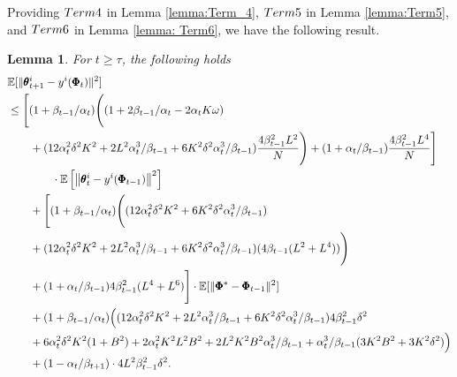 \documentclass{article} %
\theoremstyle{plain}
\newtheorem{lemma}[theorem]{Lemma}
\theoremstyle{definition}
\theoremstyle{remark}
\begin{document}
{{Providing $\textnormal{Term 4}$ in Lemma \ref{lemma:Term_4}, $\textnormal{Term 5}$ in Lemma \ref{lemma:Term5}, and $\textnormal{Term 6}$ in Lemma \ref{lemma: Term6}, we have the following result.}



\begin{lemma}
For $t\geq \tau$, the following holds
\begin{align}
  &\mathbb{E}[\|\pmb{\theta}^{i}_{t+1}-y^i(\pmb{\Phi}_t)\|^2]\nonumber\\
    &\leq\Bigg[(1+\beta_{t-1}/\alpha_t)\Bigg((1+2\beta_{t-1}/\alpha_t-2\alpha_tK\omega)\nonumber\allowdisplaybreaks\\
    &\qquad+(12\alpha_t^2\delta^2K^2+2L^2\alpha_t^3/\beta_{t-1}+6K^2\delta^2\alpha_t^3/\beta_{t-1})\frac{4\beta_{t-1}^2L^2}{N}\Bigg)+(1+\alpha_t/\beta_{t-1})\frac{4\beta_{t-1}^2L^4}{N}\Bigg]\nonumber\allowdisplaybreaks\\
    &\qquad\qquad\cdot\mathbb{E}\left[\left\|\pmb{\theta}_{t}^i-y^i(\pmb{\Phi}_{t-1})\right\|^2 \right]\nonumber\allowdisplaybreaks\\
    &\qquad+\Bigg[(1+\beta_{t-1}/\alpha_t)\Bigg((12\alpha_t^2\delta^2K^2+6K^2\delta^2\alpha_t^3/\beta_{t-1})\nonumber\allowdisplaybreaks\\
    &\qquad +(12\alpha_t^2\delta^2K^2+2L^2\alpha_t^3/\beta_{t-1}+6K^2\delta^2\alpha_t^3/\beta_{t-1})(4\beta_{t-1}(L^2+L^4))\Bigg)\nonumber\allowdisplaybreaks\\
   &\qquad+(1+\alpha_t/\beta_{t-1})4\beta_{t-1}^2(L^4+L^6)\Bigg]\cdot\mathbb{E}[\|\pmb{\Phi}^*-\pmb{\Phi}_{t-1}\|^2]\nonumber\allowdisplaybreaks\\
   &\qquad+(1+\beta_{t-1}/\alpha_t)\Big((12\alpha_t^2\delta^2K^2+2L^2\alpha_t^3/\beta_{t-1}+6K^2\delta^2\alpha_t^3/\beta_{t-1})4\beta_{t-1}^2\delta^2\nonumber\allowdisplaybreaks\\
   &\qquad+6\alpha_t^2\delta^2K^2(1+B^2)+2\alpha_t^2K^2L^2B^2+2L^2K^2B^2\alpha_t^3/\beta_{t-1}+\alpha_t^3/\beta_{t-1}(3K^2B^2+3K^2\delta^2)\Big)\nonumber\allowdisplaybreaks\\
   &\qquad+(1-\alpha_{t}/\beta_{t+1})\cdot 4L^2\beta_{t-1}^2\delta^2.
\end{align}
\end{lemma}

}
\end{document}
